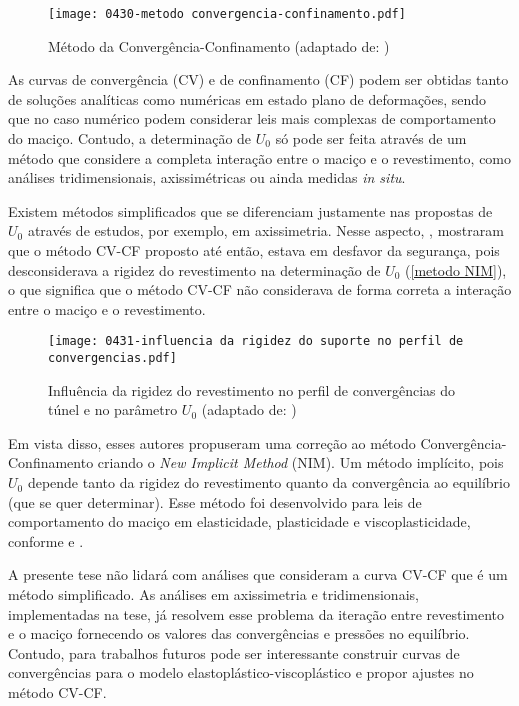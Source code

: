 \begin{figure}[H]
	\begin{center}
		\texttt{[image: 0430-metodo convergencia-confinamento.pdf]}
	\end{center}
	\caption{\label{metodo cv-cf}Método da Convergência-Confinamento (adaptado de: )}
\end{figure}

As curvas de convergência (CV) e de confinamento (CF) podem ser obtidas tanto de soluções analíticas como numéricas em estado plano de deformações, sendo que no caso numérico podem considerar leis mais complexas de comportamento do maciço. Contudo, a determinação de $U_0$ só pode ser feita através de um método que considere a completa interação entre o maciço e o revestimento, como análises tridimensionais, axissimétricas ou ainda medidas \textit{in situ}.

Existem métodos simplificados que se diferenciam justamente nas propostas de $U_0$ através de estudos, por exemplo, em axissimetria. Nesse aspecto, , mostraram que o método CV-CF proposto até então, estava em desfavor da segurança, pois desconsiderava a rigidez do revestimento na determinação de $U_0$   (\autoref{metodo NIM}), o que significa que o método CV-CF não considerava de forma correta a interação entre o maciço e o revestimento.

\begin{figure}[H]
	\begin{center}
		\texttt{[image: 0431-influencia da rigidez do suporte no perfil de convergencias.pdf]}
	\end{center}
	\caption{\label{metodo NIM}Influência da rigidez do revestimento no perfil de convergências do túnel e no parâmetro $U_0$ (adaptado de: )}
\end{figure}

Em vista disso, esses autores propuseram uma correção ao método Convergência-Confinamento criando o \textit{New Implicit Method} (NIM). Um método implícito, pois $U_0$ depende tanto da rigidez do revestimento quanto da convergência ao equilíbrio (que se quer determinar). Esse método foi desenvolvido para leis de comportamento do maciço em elasticidade, plasticidade e viscoplasticidade, conforme  e .

A presente tese não lidará com análises que consideram a curva CV-CF que é um método simplificado. As análises em axissimetria e tridimensionais, implementadas na tese, já resolvem esse problema da iteração entre revestimento e o maciço fornecendo os valores das convergências e pressões no equilíbrio. Contudo, para trabalhos futuros pode ser interessante construir curvas de convergências para o modelo elastoplástico-viscoplástico e propor ajustes no método CV-CF.